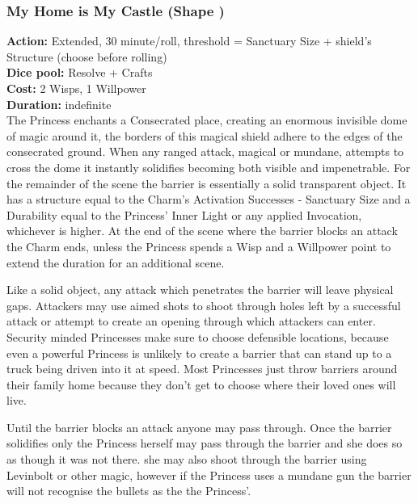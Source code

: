 \subsubsection*{My Home is My Castle (Shape \textbullet\textbullet\textbullet)}

\textbf{Action:} Extended, 30 minute/roll, threshold = Sanctuary Size + shield’s Structure (choose before rolling)\\
\textbf{Dice pool:} Resolve + Crafts\\
\textbf{Cost:} 2 Wisps, 1 Willpower\\
\textbf{Duration:} indefinite\\

\noindent The Princess enchants a Consecrated place, creating an enormous invisible dome of magic around it, the borders of this magical shield adhere to the edges of the consecrated ground. When any ranged attack, magical or mundane, attempts to cross the dome it instantly solidifies becoming both visible and impenetrable. For the remainder of the scene the barrier is essentially a solid transparent object. It has a structure equal to the Charm's Activation Successes - Sanctuary Size and a Durability equal to the Princess' Inner Light or any applied Invocation, whichever is higher. At the end of the scene where the barrier blocks an attack the Charm ends, unless the Princess spends a Wisp and a Willpower point to extend the duration for an additional scene. 

Like a solid object, any attack which penetrates the barrier will leave physical gaps. Attackers may use aimed shots to shoot through holes left by a successful attack or attempt to create an opening through which attackers can enter. Security minded Princesses make sure to choose defensible locations, because even a powerful Princess is unlikely to create a barrier that can stand up to a truck being driven into it at speed. Most Princesses just throw barriers around their family home because they don't get to choose where their loved ones will live. 

Until the barrier blocks an attack anyone may pass through. Once the barrier solidifies only the Princess herself may pass through the barrier and she does so as though it was not there. she may also shoot through the barrier using Levinbolt or other magic, however if the Princess uses a mundane gun the barrier will not recognise the bullets as the the Princess'. 

